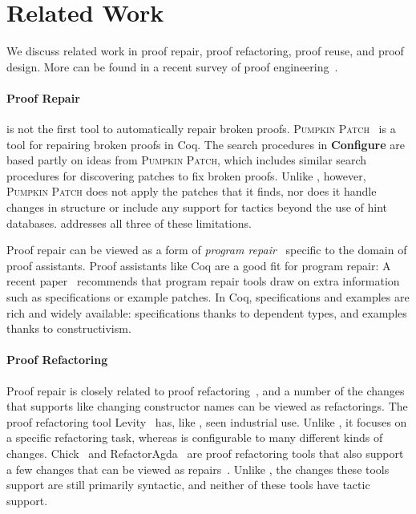 \section{Related Work}


We discuss related work in proof repair, proof refactoring, proof reuse, and proof design.
More can be found in a recent survey of proof engineering~\cite{PGL-045}.

\paragraph{Proof Repair}

\toolname is not the first tool to automatically repair broken proofs.
\textsc{Pumpkin Patch}~\cite{pumpkinpatch} is a tool for repairing broken proofs in Coq.
The search procedures in \textbf{Configure} are based partly on ideas from \textsc{Pumpkin Patch}, which includes
similar search procedures for discovering patches to fix broken proofs.
Unlike \toolname, however, \textsc{Pumpkin Patch} does not apply the patches that it finds,
nor does it handle changes in structure or include any support for tactics beyond the use of hint databases.
\toolname addresses all three of these limitations.

Proof repair can be viewed as a form of \textit{program repair}~\cite{Monperrus:2018:ASR:3177787.3105906, Gazzola:2018:ASR:3180155.3182526}
specific to the domain of proof assistants.
Proof assistants like Coq are a good fit for program repair: A recent paper~\cite{Qi:2015:APP:2771783.2771791} 
recommends that program repair tools draw on extra information
such as specifications or example patches. In Coq, specifications and examples 
are rich and widely available: specifications thanks to dependent types,
and examples thanks to constructivism.

\paragraph{Proof Refactoring}

Proof repair is closely related to proof refactoring~\cite{WhitesidePhD}, and a number of the changes
that \toolname supports like changing constructor names can be viewed as refactorings.
The proof refactoring tool Levity~\cite{Bourke12} has, like \toolname, seen industrial use.
Unlike \toolname, it focuses on a specific refactoring task, whereas \toolname is configurable to many different kinds of changes.
Chick~\cite{robert2018} and RefactorAgda~\cite{wibergh2019} are proof refactoring tools that
also support a few changes that can be viewed as repairs~\cite{PGL-045}.
Unlike \toolname, the changes these tools support are still primarily syntactic,
and neither of these tools have tactic support.

